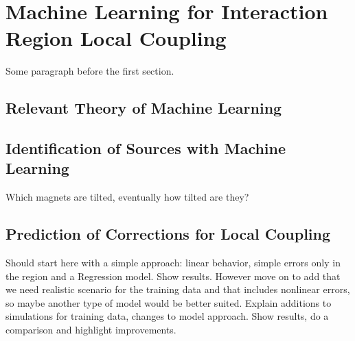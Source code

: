 
\chapter{Machine Learning for Interaction Region Local Coupling} %

\label{Chapter4} %


\newcommand{\keyword}[1]{\textbf{#1}}
\newcommand{\tabhead}[1]{\textbf{#1}}
\newcommand{\code}[1]{\texttt{#1}}
\newcommand{\file}[1]{\texttt{\bfseries#1}}
\newcommand{\option}[1]{\texttt{\itshape#1}}


Some paragraph before the first section.


\section{Relevant Theory of Machine Learning}


\section{Identification of Sources with Machine Learning}

Which magnets are tilted, eventually how tilted are they?


\section{Prediction of Corrections for Local Coupling}

Should start here with a simple approach: linear behavior, simple errors only in the region and a Regression model.
Show results.
However move on to add that we need realistic scenario for the training data and that includes nonlinear errors, so maybe another type of model would be better suited.
Explain additions to simulations for training data, changes to model approach.
Show results, do a comparison and highlight improvements.

